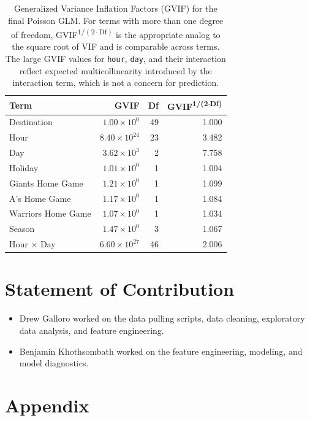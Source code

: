 \documentclass[11pt, letterpaper]{article}
\begin{document}
\begin{table}[H]
\centering
\begin{tabular}{lrrr}
\hline
\textbf{Term} & \textbf{GVIF} & \textbf{Df} & \textbf{GVIF\textsuperscript{1/(2$\cdot$Df)}} \\
\hline
Destination        & $1.00 \times 10^{0}$  & 49 & 1.000 \\
Hour               & $8.40 \times 10^{24}$ & 23 & 3.482 \\
Day                & $3.62 \times 10^{3}$  & 2  & 7.758 \\
Holiday            & $1.01 \times 10^{0}$  & 1  & 1.004 \\
Giants Home Game   & $1.21 \times 10^{0}$  & 1  & 1.099 \\
A's Home Game      & $1.17 \times 10^{0}$  & 1  & 1.084 \\
Warriors Home Game & $1.07 \times 10^{0}$  & 1  & 1.034 \\
Season             & $1.47 \times 10^{0}$  & 3  & 1.067 \\
Hour $\times$ Day  & $6.60 \times 10^{27}$ & 46 & 2.006 \\
\hline
\end{tabular}
\caption{Generalized Variance Inflation Factors (GVIF) for the final Poisson GLM.
For terms with more than one degree of freedom, GVIF\textsuperscript{$1/(2 \cdot \text{Df})$}
is the appropriate analog to the square root of VIF and is comparable across terms.
The large GVIF values for \texttt{hour}, \texttt{day}, and their interaction reflect
expected multicollinearity introduced by the interaction term, which is not a concern
for prediction.}
\label{tab:gvif}
\end{table}

\section{Statement of Contribution}
\label{sec:statement}

\begin{itemize}
    \item Drew Galloro worked on the data pulling scripts, data cleaning, exploratory data analysis, and feature engineering.
    \item Benjamin Khothsombath worked on the feature engineering, modeling, and model diagnostics.
\end{itemize}

\section{Appendix}
\label{sec:appendix}
\end{document}

